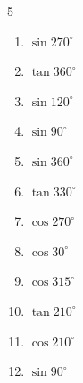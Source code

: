 \begin{multicols}{5}
\begin{enumerate}

  \item $\displaystyle \sin{270^\circ}$

        \phantom{$\displaystyle =-1$}

  \item $\displaystyle \tan{360^\circ}$

        \phantom{$\displaystyle =0$}

  \item $\displaystyle \sin{120^\circ}$


  \item $\displaystyle \sin{90^\circ}$

        \phantom{$\displaystyle =1$}

  \item $\displaystyle \sin{360^\circ}$

        \phantom{$\displaystyle =0$}

  \item $\displaystyle \tan{330^\circ}$


  \item $\displaystyle \cos{270^\circ}$

        \phantom{$\displaystyle =0$}

  \item $\displaystyle \cos{30^\circ}$


  \item $\displaystyle \cos{315^\circ}$


  \item $\displaystyle \tan{210^\circ}$


\columnbreak %

  \item $\displaystyle \cos{210^\circ}$


  \item $\displaystyle \sin{90^\circ}$

        \phantom{$\displaystyle =1$}


\end{enumerate}
\end{multicols}
